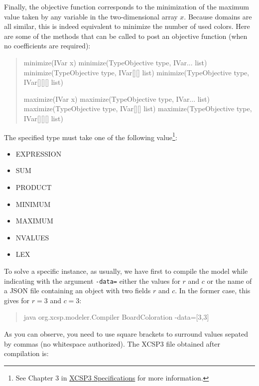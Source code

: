 \documentclass[10pt]{article}
\def\xt{{\rm XCSP3}\xspace}
\def\xt{{\rm XCSP3}\xspace}
\newenvironment{myvb}{\endgraf\small\verbatim}{\endverbatim}
\begin{document}
\bigskip
Finally, the objective function corresponds to the minimization of the maximum value taken by any variable in the two-dimensional array $x$.
Because domains are all similar, this is indeed equivalent to minimize the number of used colors.
Here are some of the methods that can be called to post an objective function (when no coefficients are required):

\begin{quote}
\begin{myvb}
minimize(IVar x) 
minimize(TypeObjective type, IVar... list) 
minimize(TypeObjective type, IVar[][] list) 
minimize(TypeObjective type, IVar[][][] list) 

maximize(IVar x) 
maximize(TypeObjective type, IVar... list) 
maximize(TypeObjective type, IVar[][] list) 
maximize(TypeObjective type, IVar[][][] list) 
\end{myvb}
\end{quote}

The specified type must take one of the following value\footnote{See Chapter 3 in \href{http://www.xcsp.org/format3.pdf}{\xt Specifications} for more information.}:
\begin{itemize}
\item EXPRESSION
\item SUM
\item PRODUCT
\item MINIMUM
\item MAXIMUM
\item NVALUES
\item LEX
\end{itemize}


\bigskip
To solve a specific instance, as usually, we have first to compile the model while indicating with the argument \verb!-data=! either the values for $r$ and $c$ or the name of a JSON file containing an object with two fields $r$ and $c$.
In the former case, this gives for $r=3$ and $c=3$: 
\begin{quote}
\begin{myvb}
java org.xcsp.modeler.Compiler BoardColoration -data=[3,3]
\end{myvb}
\end{quote}

As you can observe, you need to use square brackets to surround values sepated by commas (no whitespace authorized).
The \xt file obtained after compilation is:
\end{document}
